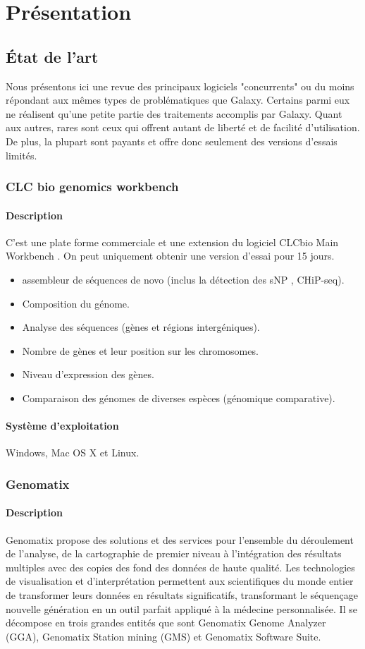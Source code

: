 \chapter{Présentation}

\section{État de l'art}

Nous présentons ici une revue des principaux logiciels "concurrents" ou du moins répondant aux mêmes types de problématiques que Galaxy. Certains parmi eux ne réalisent qu'une petite partie des traitements accomplis par Galaxy. Quant aux autres, rares sont ceux qui offrent autant de liberté et de facilité d'utilisation. De plus, la plupart sont payants et offre donc seulement des versions d'essais limités.

\subsection{CLC bio genomics workbench }
\subsubsection{Description}
C'est une plate forme commerciale et une extension du logiciel CLCbio Main Workbench .
On peut uniquement obtenir une version d'essai pour 15 jours.
\begin{itemize}
\item{assembleur de séquences de novo (inclus la détection des sNP , CHiP-seq).}
\item{Composition du génome.}
\item{Analyse des séquences (gènes et régions intergéniques).}
\item{Nombre de gènes et leur position sur les chromosomes.}
\item{Niveau d’expression des gènes.}
\item{Comparaison des génomes de diverses espèces (génomique comparative).}
\end{itemize}
\subsubsection{Système d'exploitation}
 Windows, Mac OS X et Linux.
\subsection{Genomatix}
\subsubsection{Description}
Genomatix propose des solutions et des services pour l'ensemble du déroulement de l'analyse, de la cartographie de premier niveau à l'intégration des résultats multiples avec des copies des fond des données de haute qualité. Les technologies de visualisation et d'interprétation permettent aux scientifiques du monde entier de transformer leurs données en résultats significatifs, transformant le séquençage nouvelle génération en un outil parfait appliqué à la médecine personnalisée. Il se décompose en trois grandes entités que sont Genomatix Genome Analyzer (GGA), Genomatix Station  mining (GMS) et Genomatix Software Suite.
\newpage
